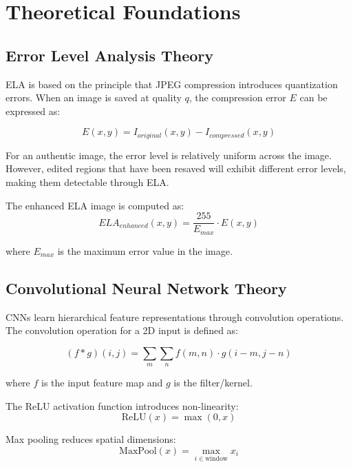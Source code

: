 \documentclass[12pt,a4paper]{article}
\begin{document}
\section{Theoretical Foundations}

\subsection{Error Level Analysis Theory}
ELA is based on the principle that JPEG compression introduces quantization errors. When an image is saved at quality $q$, the compression error $E$ can be expressed as:

\begin{equation}
E(x,y) = I_{original}(x,y) - I_{compressed}(x,y)
\end{equation}

For an authentic image, the error level is relatively uniform across the image. However, edited regions that have been resaved will exhibit different error levels, making them detectable through ELA.

The enhanced ELA image is computed as:
\begin{equation}
ELA_{enhanced}(x,y) = \frac{255}{E_{max}} \cdot E(x,y)
\end{equation}

where $E_{max}$ is the maximum error value in the image.

\subsection{Convolutional Neural Network Theory}
CNNs learn hierarchical feature representations through convolution operations. The convolution operation for a 2D input is defined as:

\begin{equation}
(f * g)(i,j) = \sum_{m} \sum_{n} f(m,n) \cdot g(i-m, j-n)
\end{equation}

where $f$ is the input feature map and $g$ is the filter/kernel.

The ReLU activation function introduces non-linearity:
\begin{equation}
\text{ReLU}(x) = \max(0, x)
\end{equation}

Max pooling reduces spatial dimensions:
\begin{equation}
\text{MaxPool}(x) = \max_{i \in \text{window}} x_i
\end{equation}
\end{document}
